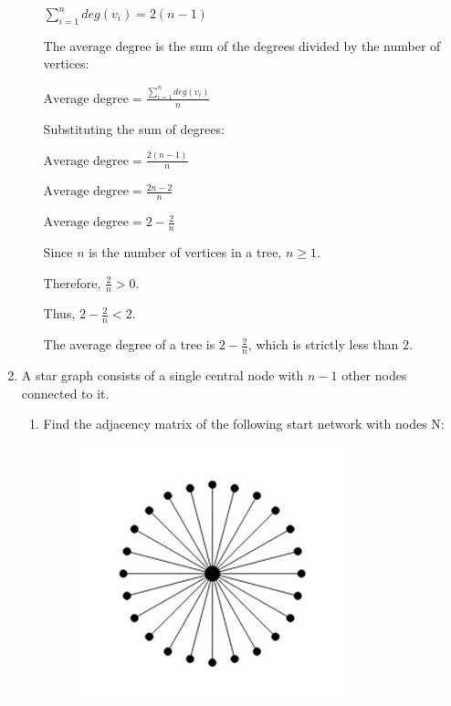 \documentclass{amsart}
\theoremstyle{definition}
\theoremstyle{remark}
\numberwithin{equation}{section}
\begin{document}
\begin{enumerate}
\begin{enumerate}
$ \sum_{i=1}^{n} deg(v_i) = 2(n-1) $

\vspace{0.2cm}

The average degree is the sum of the degrees divided by the number of vertices:

\vspace{0.2cm}

$ \text{Average degree} = \frac{\sum_{i=1}^{n} deg(v_i)}{n} $

\vspace{0.2cm}

Substituting the sum of degrees:

\vspace{0.2cm}
$ \text{Average degree} = \frac{2(n-1)}{n} $

\vspace{0.2cm}

$ \text{Average degree} = \frac{2n-2}{n} $

\vspace{0.2cm}

$ \text{Average degree} = 2 - \frac{2}{n} $

\vspace{0.2cm}

Since \(n\) is the number of vertices in a tree, \(n\ge 1\).

\vspace{0.2cm}

Therefore, \(\frac{2}{n}>0\).

\vspace{0.2cm}

Thus, \(2-\frac{2}{n}<2\).

The average degree of a tree is \(2-\frac{2}{n}\), which is strictly less than \(2\).

\vspace{0.2cm}
\end{enumerate}

\vspace{5cm}

\item A star graph consists of a single central node with $n-1$ other nodes connected to it. 
\begin{enumerate}
\item Find the adjacency matrix of the following start network with nodes N:
\begin{figure}[h]
\includegraphics[width=0.3\linewidth]{images/stargraph.PNG}
\end{figure}


\end{enumerate}
\end{enumerate}
\end{document}
